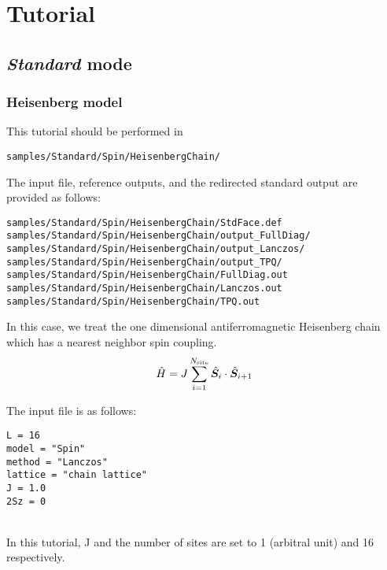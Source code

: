 \chapter{Tutorial}
\label{Ch:model}
\section{{\it Standard} mode}

\subsection{Heisenberg model}

This tutorial should be performed in 
\begin{verbatim}
samples/Standard/Spin/HeisenbergChain/
\end{verbatim}

The input file, reference outputs, and the redirected standard output are
provided as follows:
\begin{verbatim}
samples/Standard/Spin/HeisenbergChain/StdFace.def
samples/Standard/Spin/HeisenbergChain/output_FullDiag/
samples/Standard/Spin/HeisenbergChain/output_Lanczos/
samples/Standard/Spin/HeisenbergChain/output_TPQ/
samples/Standard/Spin/HeisenbergChain/FullDiag.out
samples/Standard/Spin/HeisenbergChain/Lanczos.out
samples/Standard/Spin/HeisenbergChain/TPQ.out
\end{verbatim}
%
In this case, we treat the one dimensional antiferromagnetic Heisenberg chain
which has a nearest neighbor spin coupling.
\begin{align}
  {\hat H} = J \sum_{i=1}^{N_{\rm site}} {\hat {\boldsymbol S}}_i \cdot {\hat {\boldsymbol S}}_{i+1}
\end{align}

The input file is as follows:
\\
\begin{minipage}{10cm}
\begin{screen}
\begin{verbatim}
L = 16
model = "Spin"
method = "Lanczos"
lattice = "chain lattice"
J = 1.0
2Sz = 0
\end{verbatim}
\end{screen}
\end{minipage}
%
\\
In this tutorial, J and the number of sites are set to 1 (arbitral unit)
and 16 respectively.

